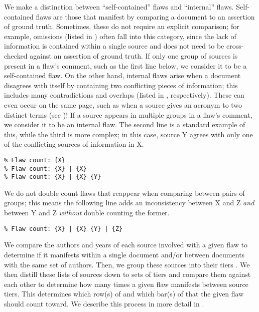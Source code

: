 We make a distinction between ``self-contained'' flaws and ``internal'' flaws.
Self-contained flaws are those that manifest by comparing a document to an
assertion of ground truth. Sometimes, these do not require an explicit comparison;
for example, omissions (listed in ) often fall into this category,
since the lack of information is contained within a single source and does not
need to be cross-checked against an assertion of ground truth. If only one group
of sources is present in a flaw's comment, such as the first line below, we
consider it to be a self-contained flaw. On the other hand, internal flaws
arise when a document disagrees with itself by containing two conflicting
pieces of information; this includes many contradictions and overlaps (listed
in , respectively). These can even occur on the same page,
such as when a source gives an acronym to two distinct terms
(see )! If a
source appears in multiple groups in a flaw's comment, we consider it to
be an internal flaw. The second line is a standard example of this, while the
third is more complex; in this case, source Y agrees with only one of the
conflicting sources of information in X.
\begin{displayquote}
    \texttt{\% Flaw count: \{X\}\\\% Flaw count: \{X\} | \{X\}\\
        \% Flaw count: \{X\} | \{X\} \{Y\}}
\end{displayquote}
We do not double count flaws that reappear when comparing between pairs of
groups; this means the following line adds an inconsistency between X and Z
\emph{and} between Y and Z \emph{without} double counting the former.
\begin{displayquote}
    \texttt{\% Flaw count: \{X\} | \{X\} \{Y\} | \{Z\}}
\end{displayquote}

We compare the authors and years of each source involved with a given flaw
to determine if it manifests within a single document and/or between documents
with the same set of authors. Then, we group these sources into their tiers
.
We then distill these lists of sources down to sets of tiers and compare them
against each other to determine how many times a given flaw manifests between
source tiers. This determines which row(s) of 
and which bar(s) of  that the given flaw should count toward.
We describe this process in more detail in .


